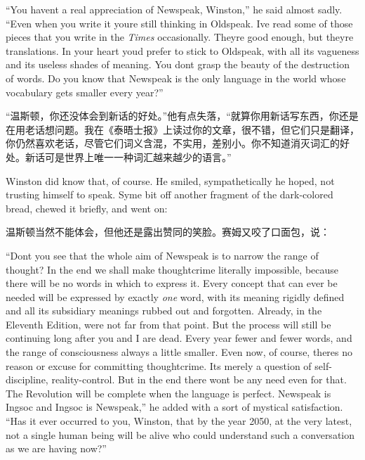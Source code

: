 \begin{paracol}{2}
\switchcolumn*

``You haven\textquotesingle t a real appreciation of Newspeak, Winston,''
he said almost sadly. ``Even when you write it you\textquotesingle re
still thinking in Oldspeak. I\textquotesingle ve read some of those
pieces that you write in the \emph{Times} occasionally.
They\textquotesingle re good enough, but they\textquotesingle re
translations. In your heart you\textquotesingle d prefer to stick to
Oldspeak, with all its vagueness and its useless shades of meaning. You
don\textquotesingle t grasp the beauty of the destruction of words. Do
you know that Newspeak is the only language in the world whose
vocabulary gets smaller every year?''

\switchcolumn

``温斯顿，你还没体会到新话的好处。''他有点失落，``就算你用新话写东西，你还是在用老话想问题。我在《泰晤士报》上读过你的文章，很不错，但它们只是翻译，你仍然喜欢老话，尽管它们词义含混，不实用，差别小。你不知道消灭词汇的好处。新话可是世界上唯一一种词汇越来越少的语言。''

\switchcolumn*

Winston did know that, of course. He smiled, sympathetically he hoped,
not trusting himself to speak. Syme bit off another fragment of the
dark-colored bread, chewed it briefly, and went on:

\switchcolumn

温斯顿当然不能体会，但他还是露出赞同的笑脸。赛姆又咬了口面包，说：

\switchcolumn*

``Don\textquotesingle t you see that the whole aim of Newspeak is to
narrow the range of thought? In the end we shall make thoughtcrime
literally impossible, because there will be no words in which to express
it. Every concept that can ever be needed will be expressed by exactly
\emph{one} word, with its meaning rigidly defined and all its subsidiary
meanings rubbed out and forgotten. Already, in the Eleventh Edition,
we\textquotesingle re not far from that point. But the process will
still be continuing long after you and I are dead. Every year fewer and
fewer words, and the range of consciousness always a little smaller.
Even now, of course, there\textquotesingle s no reason or excuse for
committing thoughtcrime. It\textquotesingle s merely a question of
self-discipline, reality-control. But in the end there
won\textquotesingle t be any need even for that. The Revolution will be
complete when the language is perfect. Newspeak is Ingsoc and Ingsoc is
Newspeak,'' he added with a sort of mystical satisfaction. ``Has it ever
occurred to you, Winston, that by the year 2050, at the very latest, not
a single human being will be alive who could understand such a
conversation as we are having now?''


\end{paracol}
